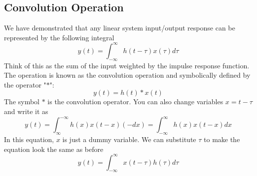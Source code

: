 \subsection{Convolution Operation}
We have demonstrated that any linear system input/output response can be represented by the following integral
    \begin{equation}
        y(t) = \int_{-\infty}^{\infty} h(t-\tau) x(\tau) d\tau 
    \end{equation}
Think of this as the sum of the input weighted by the impulse response function.  The operation is known as the convolution operation and symbolically defined by the operator "$*$":  
    \begin{equation}
        y(t) = h(t) * x(t)
    \end{equation}
The symbol $*$ is the convolution operator. You can also change variables $x = t - \tau$ and write it as
    \begin{equation}
        y(t) = \int_{\infty}^{-\infty} h(x) x(t-x) (-dx) = \int_{-\infty}^{\infty} h(x) x(t-x) dx 
    \end{equation}
In this equation, $x$ is just a dummy variable.  We can substitute $\tau$ to make the equation look the same as before
    \begin{equation}
        y(t) =  \int_{-\infty}^{\infty} x(t-\tau) h(\tau)  d\tau 
    \end{equation}
